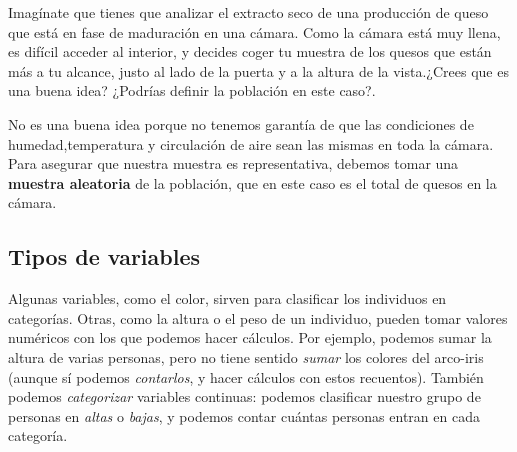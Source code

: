 \documentclass[
  letterpaper,
  DIV=11,
  numbers=noendperiod,
  oneside]{scrreprt}
\begin{document}
\begin{tcolorbox}[enhanced jigsaw, colback=white, opacitybacktitle=0.6, leftrule=.75mm, opacityback=0, coltitle=black, colframe=quarto-callout-note-color-frame, colbacktitle=quarto-callout-note-color!10!white, bottomrule=.15mm, title={Ejemplo 1: Muestreando una cámara de maduración de queso}, bottomtitle=1mm, toptitle=1mm, breakable, left=2mm, arc=.35mm, titlerule=0mm, rightrule=.15mm, toprule=.15mm]

Imagínate que tienes que analizar el extracto seco de una producción de
queso que está en fase de maduración en una cámara. Como la cámara está
muy llena, es difícil acceder al interior, y decides coger tu muestra de
los quesos que están más a tu alcance, justo al lado de la puerta y a la
altura de la vista.¿Crees que es una buena idea? ¿Podrías definir la
población en este caso?.

\end{tcolorbox}

\begin{tcolorbox}[enhanced jigsaw, colback=white, opacitybacktitle=0.6, leftrule=.75mm, opacityback=0, coltitle=black, colframe=quarto-callout-tip-color-frame, colbacktitle=quarto-callout-tip-color!10!white, bottomrule=.15mm, title={Respuesta al ejemplo 1: Muestreando una cámara de maduración de queso}, bottomtitle=1mm, toptitle=1mm, breakable, left=2mm, arc=.35mm, titlerule=0mm, rightrule=.15mm, toprule=.15mm]

No es una buena idea porque no tenemos garantía de que las condiciones
de humedad,temperatura y circulación de aire sean las mismas en toda la
cámara. Para asegurar que nuestra muestra es representativa, debemos
tomar una \textbf{muestra aleatoria} de la población, que en este caso
es el total de quesos en la cámara.

\end{tcolorbox}

\hypertarget{tipos-de-variables}{%
\subsection{Tipos de variables}\label{tipos-de-variables}}

Algunas variables, como el color, sirven para clasificar los individuos
en categorías. Otras, como la altura o el peso de un individuo, pueden
tomar valores numéricos con los que podemos hacer cálculos. Por ejemplo,
podemos sumar la altura de varias personas, pero no tiene sentido
\emph{sumar} los colores del arco-iris (aunque sí podemos
\emph{contarlos}, y hacer cálculos con estos recuentos). También podemos
\emph{categorizar} variables continuas: podemos clasificar nuestro grupo
de personas en \emph{altas} o \emph{bajas}, y podemos contar cuántas
personas entran en cada categoría.
\end{document}
